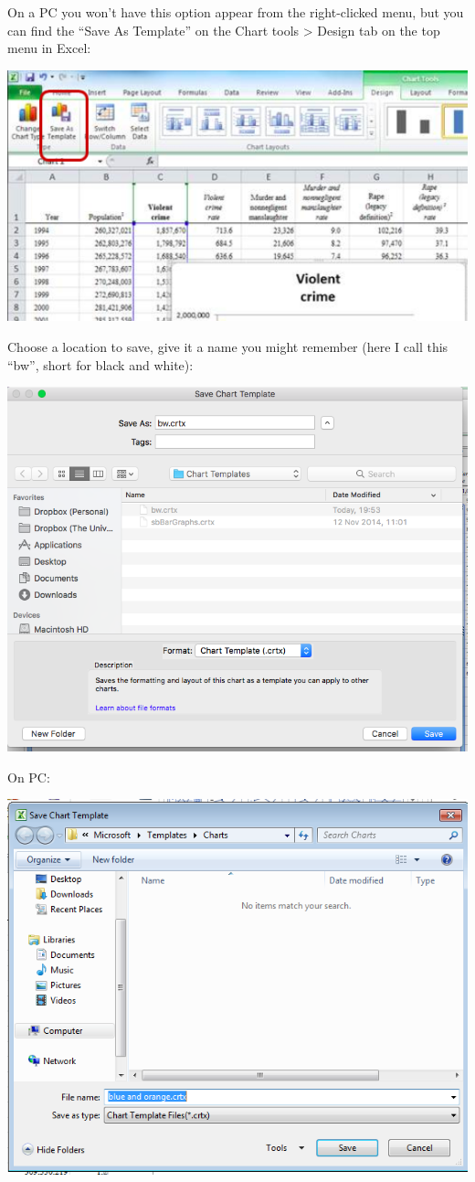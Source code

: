 \documentclass[]{book}
\theoremstyle{definition}
\theoremstyle{definition}
\theoremstyle{definition}
\theoremstyle{remark}
\begin{document}
On a PC you won't have this option appear from the right-clicked menu,
but you can find the ``Save As Template'' on the Chart tools
\textgreater{} Design tab on the top menu in Excel:

\includegraphics{imgs/pc_save_template.png}

Choose a location to save, give it a name you might remember (here I
call this ``bw'', short for black and white):

\includegraphics{imgs/name_template.png}

On PC:

\includegraphics{imgs/pc_save_template_3.png}
\end{document}
